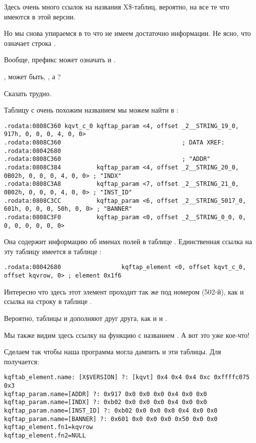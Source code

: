 Здесь очень много ссылок на названия X\$-таблиц, вероятно, на все те что имеются в \oracle этой версии.

Но мы снова упираемся в то что не имеем достаточно информации.
Не ясно, что означает строка .
 
Вообще, префикс  может означать  и .
 
, может быть, , а \EMDASH{}?
 
Сказать трудно.

Таблицу с очень похожим названием мы можем найти в :

\begin{lstlisting}[caption=kqf.o]
.rodata:0808C360 kqvt_c_0 kqftap_param <4, offset _2__STRING_19_0, 917h, 0, 0, 0, 4, 0, 0>
.rodata:0808C360                                  ; DATA XREF: .rodata:08042680
.rodata:0808C360                                  ; "ADDR"
.rodata:0808C384          kqftap_param <4, offset _2__STRING_20_0, 0B02h, 0, 0, 0, 4, 0, 0> ; "INDX"
.rodata:0808C3A8          kqftap_param <7, offset _2__STRING_21_0, 0B02h, 0, 0, 0, 4, 0, 0> ; "INST_ID"
.rodata:0808C3CC          kqftap_param <6, offset _2__STRING_5017_0, 601h, 0, 0, 0, 50h, 0, 0> ; "BANNER"
.rodata:0808C3F0          kqftap_param <0, offset _2__STRING_0_0, 0, 0, 0, 0, 0, 0, 0>
\end{lstlisting}

Она содержит информацию об именах полей в таблице .
Единственная ссылка на эту таблицу имеется в таблице :

\begin{lstlisting}[caption=kqf.o]
.rodata:08042680                 kqftap_element <0, offset kqvt_c_0, offset kqvrow, 0> ; element 0x1f6
\end{lstlisting}

Интересно что здесь этот элемент проходит так же под номером  (502-й), как и ссылка на строку 
 в таблице .

Вероятно, таблицы  и  дополняют друг друга, как и  и .

Мы также видим здесь ссылку на функцию с названием . А вот это уже кое-что!

Сделаем так чтобы наша программа \oracletables могла дампить и эти таблицы. Для  получается:

\begin{lstlisting}[caption=Результат работы \OracleTablesName]
kqftab_element.name: [X$VERSION] ?: [kqvt] 0x4 0x4 0x4 0xc 0xffffc075 0x3
kqftap_param.name=[ADDR] ?: 0x917 0x0 0x0 0x0 0x4 0x0 0x0
kqftap_param.name=[INDX] ?: 0xb02 0x0 0x0 0x0 0x4 0x0 0x0
kqftap_param.name=[INST_ID] ?: 0xb02 0x0 0x0 0x0 0x4 0x0 0x0
kqftap_param.name=[BANNER] ?: 0x601 0x0 0x0 0x0 0x50 0x0 0x0
kqftap_element.fn1=kqvrow
kqftap_element.fn2=NULL
\end{lstlisting}

